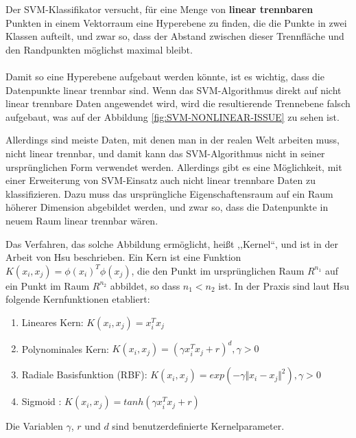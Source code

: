 Der SVM-Klassifikator versucht, für eine Menge von \textbf{linear trennbaren} Punkten in einem Vektorraum eine Hyperebene zu finden, die die Punkte in zwei Klassen aufteilt, und zwar so, dass der Abstand zwischen dieser Trennfläche und den Randpunkten möglichst maximal bleibt.

\paragraph{}
Damit so eine Hyperebene aufgebaut werden könnte, ist es wichtig, dass die Datenpunkte linear trennbar sind. Wenn das SVM-Algorithmus direkt auf nicht linear trennbare Daten angewendet wird, wird die resultierende Trennebene falsch aufgebaut, was auf der Abbildung \ref{fig:SVM-NONLINEAR-ISSUE} zu sehen ist. 

Allerdings sind meiste Daten, mit denen man in der realen Welt arbeiten muss, nicht linear trennbar, und damit kann das SVM-Algorithmus nicht in seiner ursprünglichen Form verwendet werden. Allerdings gibt es eine Möglichkeit, mit einer Erweiterung von SVM-Einsatz auch nicht linear trennbare Daten zu klassifizieren. Dazu muss das ursprüngliche Eigenschaftensraum auf ein Raum höherer Dimension abgebildet werden, und zwar so, dass die Datenpunkte in neuem Raum linear trennbar wären\cite{Hearst:98}.

Das Verfahren, das solche Abbildung ermöglicht, heißt ,,Kernel``, und ist in der Arbeit von Hsu\cite{hsu2003practical} beschrieben. Ein Kern ist eine Funktion 
$K(x_i,x_j) = \phi(x_i)^T \phi(x_j)$, die den Punkt im ursprünglichen Raum $R^{n_1}$ auf ein Punkt im Raum $R^{n_2}$ abbildet, so dass $n_1 < n_2$ ist. In der Praxis sind laut Hsu\cite{hsu2003practical} folgende Kernfunktionen etabliert:
\begin{enumerate}
\item Lineares Kern: $K(x_i,x_j) = x_i^T x_j$
\item Polynominales Kern: $K(x_i,x_j) = (\gamma x_i^T x_j + r)^d, \gamma > 0$
\item Radiale Basisfunktion (RBF): $K(x_i,x_j) = exp(-\gamma \Vert x_i - x_j \Vert^2), \gamma > 0$
\item Sigmoid : $K(x_i,x_j) = tanh(\gamma x_i^T x_j + r)$
\end{enumerate}
Die Variablen $\gamma$, $r$ und $d$ sind benutzerdefinierte Kernelparameter.


